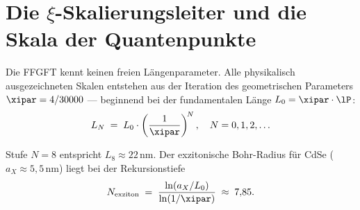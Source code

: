 \section{Die \texorpdfstring{$\xi$}{xi}-Skalierungsleiter und
  die Skala der Quantenpunkte}
\label{sec:xi-leiter}

Die FFGFT kennt keinen freien Längenparameter.
Alle physikalisch ausgezeichneten Skalen entstehen aus der
Iteration des geometrischen Parameters $\xipar = 4/30000$
--- beginnend bei der fundamentalen Länge
$L_0 = \xipar \cdot \lP$:
\begin{equation}
  L_N \;=\; L_0 \cdot \left(\frac{1}{\xipar}\right)^{\!N},
  \quad N = 0, 1, 2, \ldots
\end{equation}

\begin{center}
\end{center}

Stufe $N = 8$ entspricht $L_8 \approx 22$\,nm.
Der exzitonische Bohr-Radius für CdSe ($a_X \approx 5{,}5$\,nm)
liegt bei der Rekursionstiefe
\begin{equation}
  N_{\text{exziton}} \;=\;
  \frac{\ln(a_X / L_0)}{\ln(1/\xipar)} \;\approx\; 7{,}85.
\end{equation}

